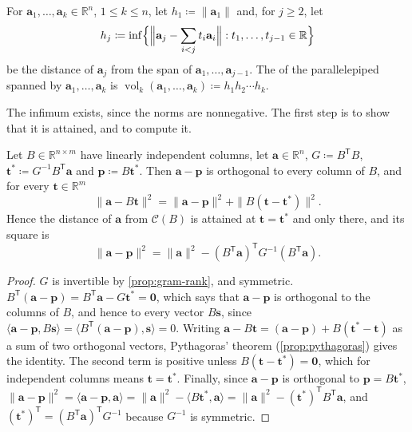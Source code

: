 \begin{definition}
\label{def:k-volume}
For $\mathbf a_1,\ldots,\mathbf a_k\in\mathbb R^n$, $1\le k\le n$, let $h_1\coloneqq\|\mathbf a_1\|$ and, for $j\ge2$, let
\[
h_j\coloneqq\inf\Bigl\{\Bigl\|\mathbf a_j-\sum_{i<j}t_i\mathbf a_i\Bigr\|: t_1,\ldots,t_{j-1}\in\mathbb R\Bigr\}
\]
be the distance of $\mathbf a_j$ from the span of $\mathbf a_1,\ldots,\mathbf a_{j-1}$. The  of the parallelepiped spanned by $\mathbf a_1,\ldots,\mathbf a_k$ is $\operatorname{vol}_k(\mathbf a_1,\ldots,\mathbf a_k)\coloneqq h_1h_2\cdots h_k$.
\end{definition}

The infimum exists, since the norms are nonnegative. The first step is to show that it is attained, and to compute it.

\begin{lemma}
\label{lem:distance-span}
Let $B\in\mathbb R^{n\times m}$ have linearly independent columns, let $\mathbf a\in\mathbb R^n$, $G\coloneqq B^{\mathsf T}B$, $\mathbf t^*\coloneqq G^{-1}B^{\mathsf T}\mathbf a$ and $\mathbf p\coloneqq B\mathbf t^*$. Then $\mathbf a-\mathbf p$ is orthogonal to every column of $B$, and for every $\mathbf t\in\mathbb R^m$
\[
\|\mathbf a-B\mathbf t\|^2=\|\mathbf a-\mathbf p\|^2+\|B(\mathbf t-\mathbf t^*)\|^2 .
\]
Hence the distance of $\mathbf a$ from $\mathcal C(B)$ is attained at $\mathbf t=\mathbf t^*$ and only there, and its square is
\[
\|\mathbf a-\mathbf p\|^2=\|\mathbf a\|^2-(B^{\mathsf T}\mathbf a)^{\mathsf T}G^{-1}(B^{\mathsf T}\mathbf a).
\]
\end{lemma}

\begin{proof}
$G$ is invertible by \cref{prop:gram-rank}, and symmetric. $B^{\mathsf T}(\mathbf a-\mathbf p)=B^{\mathsf T}\mathbf a-G\mathbf t^*=\mathbf 0$, which says that $\mathbf a-\mathbf p$ is orthogonal to the columns of $B$, and hence to every vector $B\mathbf s$, since $\langle\mathbf a-\mathbf p,B\mathbf s\rangle=\langle B^{\mathsf T}(\mathbf a-\mathbf p),\mathbf s\rangle=0$. Writing $\mathbf a-B\mathbf t=(\mathbf a-\mathbf p)+B(\mathbf t^*-\mathbf t)$ as a sum of two orthogonal vectors, Pythagoras' theorem (\cref{prop:pythagoras}) gives the identity. The second term is positive unless $B(\mathbf t-\mathbf t^*)=\mathbf 0$, which for independent columns means $\mathbf t=\mathbf t^*$. Finally, since $\mathbf a-\mathbf p$ is orthogonal to $\mathbf p=B\mathbf t^*$, $\|\mathbf a-\mathbf p\|^2=\langle\mathbf a-\mathbf p,\mathbf a\rangle=\|\mathbf a\|^2-\langle B\mathbf t^*,\mathbf a\rangle=\|\mathbf a\|^2-(\mathbf t^*)^{\mathsf T}B^{\mathsf T}\mathbf a$, and $(\mathbf t^*)^{\mathsf T}=(B^{\mathsf T}\mathbf a)^{\mathsf T}G^{-1}$ because $G^{-1}$ is symmetric.
\end{proof}

